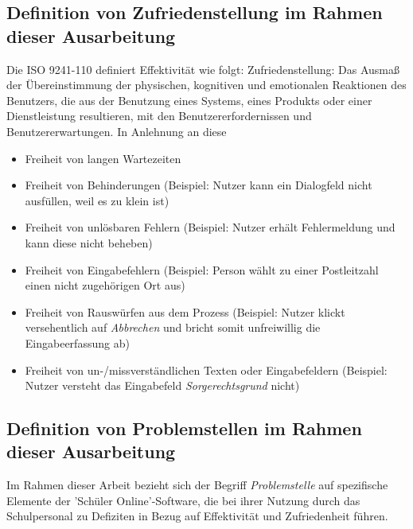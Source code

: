 \subsection{Definition von Zufriedenstellung im Rahmen dieser Ausarbeitung}
Die ISO 9241-110 definiert Effektivität wie folgt: Zufriedenstellung: \glqq Das Ausmaß der Übereinstimmung der physischen, kognitiven und emotionalen Reaktionen des Benutzers, die aus der Benutzung eines Systems, eines Produkts oder einer Dienstleistung resultieren, mit den Benutzererfordernissen und Benutzererwartungen.\glqq \cite{ISO-9241-110} In Anlehnung an diese
\begin{itemize}
    \item Freiheit von langen Wartezeiten
    \item Freiheit von Behinderungen (Beispiel: Nutzer kann ein Dialogfeld nicht ausfüllen, weil es zu klein ist)
    \item Freiheit von unlösbaren Fehlern (Beispiel: Nutzer erhält Fehlermeldung und kann diese nicht beheben)
    \item Freiheit von Eingabefehlern (Beispiel: Person wählt zu einer Postleitzahl einen nicht zugehörigen Ort aus)
    \item Freiheit von Rauswürfen aus dem Prozess (Beispiel: Nutzer klickt versehentlich auf \textit{Abbrechen} und bricht somit unfreiwillig die Eingabeerfassung ab)
    \item Freiheit von un-/missverständlichen Texten oder Eingabefeldern (Beispiel: Nutzer versteht das Eingabefeld \textit{Sorgerechtsgrund} nicht)
\end{itemize}

\subsection{Definition von Problemstellen im Rahmen dieser Ausarbeitung }
Im Rahmen dieser Arbeit bezieht sich der Begriff \textit{Problemstelle} auf spezifische Elemente der 'Schüler Online'-Software, die bei ihrer Nutzung durch das Schulpersonal zu Defiziten in Bezug auf Effektivität und Zufriedenheit führen.

